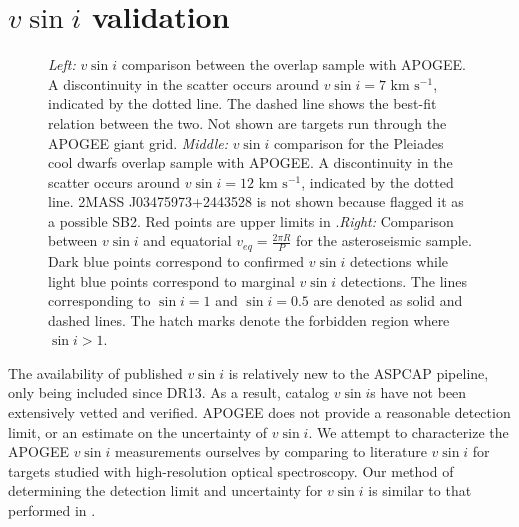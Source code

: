 \documentclass[manuscript]{aastex6}
\newcommand{\vsini}{\ensuremath{v \sin i}}
\newcommand{\kms}{\textrm{~km~s}\ensuremath{^{-1}}}
\begin{document}
\section{\vsini{} validation}
\label{sec:vsini_check}

\begin{figure*}
    \caption{\emph{Left:} \vsini{} comparison between the \citet{Bruntt12}
        overlap sample with APOGEE\@. A discontinuity in the scatter occurs
        around \(\vsini = 7 \kms\), indicated by the dotted line. The dashed
    line shows the best-fit relation between the two. Not shown are targets 
    run through the APOGEE giant grid. \emph{Middle:} \vsini{} comparison for 
    the Pleiades cool dwarfs \citep{Stauffer87} overlap sample with APOGEE\@. 
    A discontinuity in the scatter occurs around \(\vsini = 12 \kms\), 
    indicated by the dotted line. 2MASS J03475973+2443528 is not shown
    because \citet{Stauffer87} flagged it as a possible SB2. Red points are 
    upper limits in \citet{Stauffer87}.\emph{Right:} Comparison between
    \vsini{} and equatorial \(v_{eq} = \frac{2\pi R}{P}\) for the 
    asteroseismic sample. Dark blue points correspond to confirmed
    \vsini{} detections while light blue points correspond to marginal
    \vsini{} detections. The lines corresponding to \(\sin i = 1\) and
    \(\sin i = 0.5\) are denoted as solid and dashed lines. The hatch
    marks denote the forbidden region where \(\sin i > 1\).\label{fig:comps}}
\end{figure*}


The availability of published \vsini{} is relatively new to the ASPCAP pipeline, only
being included since DR13. As a result, catalog \vsini{}s have not been 
extensively vetted and verified. APOGEE does not provide a reasonable
detection limit, or an estimate on the uncertainty of \vsini{}. We
attempt to characterize the APOGEE \vsini{} measurements ourselves
by comparing to literature \vsini{} for targets studied with high-resolution 
optical spectroscopy. Our method of determining the detection limit and
uncertainty for \vsini{} is similar to that performed in
\citet{Tayar15}.
\end{document}
